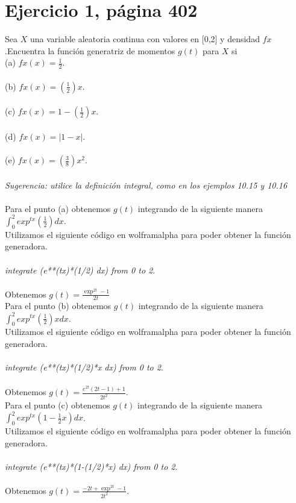 \documentclass[]{article}
\begin{document}
\section{Ejercicio 1, página 402}

Sea  $X$ una variable aleatoria continua con valores en [0,2] y densidad $fx$.Encuentra la función generatriz de momentos $g(t)$ para $X$ si\\
(a) $fx(x) = \frac{1}{2}$.\\
\\
(b) $fx(x) = (\frac{1}{2})x$.\\
\\
(c) $fx(x) = 1 - (\frac{1}{2})x$.\\
\\
(d) $fx(x) = |1 - x|$.\\
\\
(e) $fx(x) = (\frac{3}{8})x^{2}$.\\
\\

\textit{Sugerencia: utilice la definición integral, como en los ejemplos 10.15 y 10.16}\\
\\
Para el punto (a) obtenemos $g(t)$ integrando de la siguiente manera $\int_{0}^{2} exp^{tx}(\frac{1}{2})dx$.\\
Utilizamos el siguiente código en wolframalpha para poder 
obtener la función generadora.\\
\\
\textit{integrate (e**(tx)*(1/2) dx) from 0 to 2}.\\
\\
Obtenemos $g(t) = \frac{\exp^{2t}-1}{2t}$\\
Para el punto (b) obtenemos $g(t)$ integrando de la siguiente manera $\int_{0}^{2} exp^{tx}(\frac{1}{2})xdx$.\\
Utilizamos el siguiente código en wolframalpha para poder 
obtener la función generadora.\\
\\
\textit{integrate (e**(tx)*(1/2)*x dx) from 0 to 2}.\\
\\
Obtenemos $g(t) = \frac{e^{2t}(2t-1)+1}{2t^{2}}$.\\
Para el punto (c) obtenemos $g(t)$ integrando de la siguiente manera $\int_{0}^{2} exp^{tx}(1 - \frac{1}{2}x)dx$.\\
Utilizamos el siguiente código en wolframalpha para poder 
obtener la función generadora.\\
\\
\textit{integrate (e**(tx)*(1-(1/2)*x) dx) from 0 to 2}.\\
\\
Obtenemos $g(t) = \frac{-2t + \exp^{2t}-1}{2t^{2}}$.\\
\end{document}
